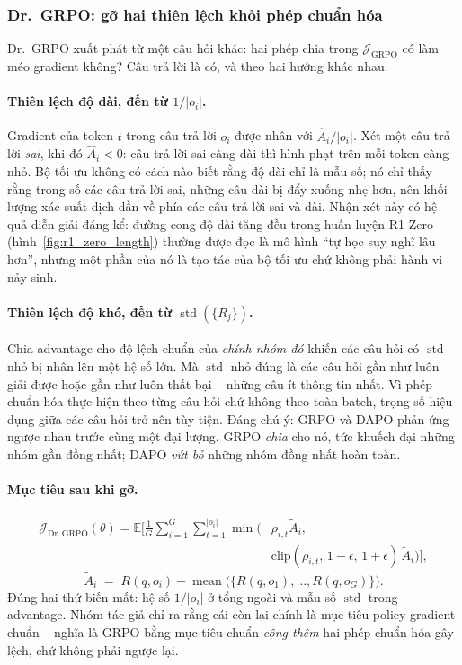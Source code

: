 \subsubsection{Dr.~GRPO: gỡ hai thiên lệch khỏi phép chuẩn hóa}

Dr.~GRPO \cite{liu2025drgrpo} xuất phát từ một câu hỏi khác: hai phép chia trong $\mathcal{J}_{\mathrm{GRPO}}$ có làm méo gradient không? Câu trả lời là có, và theo hai hướng khác nhau.

\paragraph{Thiên lệch độ dài, đến từ $1/|o_i|$.}
Gradient của token $t$ trong câu trả lời $o_i$ được nhân với $\hat{A}_i / |o_i|$. Xét một câu trả lời \emph{sai}, khi đó $\hat{A}_i < 0$: câu trả lời sai càng dài thì hình phạt trên mỗi token càng nhỏ. Bộ tối ưu không có cách nào biết rằng độ dài chỉ là mẫu số; nó chỉ thấy rằng trong số các câu trả lời sai, những câu dài bị đẩy xuống nhẹ hơn, nên khối lượng xác suất dịch dần về phía các câu trả lời sai và dài. Nhận xét này có hệ quả diễn giải đáng kể: đường cong độ dài tăng đều trong huấn luyện R1-Zero (hình~\ref{fig:r1_zero_length}) thường được đọc là mô hình ``tự học suy nghĩ lâu hơn'', nhưng một phần của nó là tạo tác của bộ tối ưu chứ không phải hành vi nảy sinh.

\paragraph{Thiên lệch độ khó, đến từ $\operatorname{std}(\{R_j\})$.}
Chia advantage cho độ lệch chuẩn của \emph{chính nhóm đó} khiến các câu hỏi có $\operatorname{std}$ nhỏ bị nhân lên một hệ số lớn. Mà $\operatorname{std}$ nhỏ đúng là các câu hỏi gần như luôn giải được hoặc gần như luôn thất bại -- những câu ít thông tin nhất. Vì phép chuẩn hóa thực hiện theo từng câu hỏi chứ không theo toàn batch, trọng số hiệu dụng giữa các câu hỏi trở nên tùy tiện. Đáng chú ý: GRPO và DAPO phản ứng ngược nhau trước cùng một đại lượng. GRPO \emph{chia} cho nó, tức khuếch đại những nhóm gần đồng nhất; DAPO \emph{vứt bỏ} những nhóm đồng nhất hoàn toàn.

\paragraph{Mục tiêu sau khi gỡ.}
\[
\begin{aligned}
\mathcal{J}_{\mathrm{Dr.\,GRPO}}(\theta) = \mathbb{E}\Big[\frac{1}{G}\sum_{i=1}^{G}\sum_{t=1}^{|o_i|}
\min\big(&\rho_{i,t}\tilde{A}_i,\\
&\mathrm{clip}(\rho_{i,t},\,1-\epsilon,\,1+\epsilon)\,\tilde{A}_i\big)\Big],
\end{aligned}
\]
\[
\tilde{A}_i \;=\; R(q, o_i) - \operatorname{mean}\big(\{R(q,o_1),\dots,R(q,o_G)\}\big).
\]
Đúng hai thứ biến mất: hệ số $1/|o_i|$ ở tổng ngoài và mẫu số $\operatorname{std}$ trong advantage. Nhóm tác giả chỉ ra rằng cái còn lại chính là mục tiêu policy gradient chuẩn -- nghĩa là GRPO bằng mục tiêu chuẩn \emph{cộng thêm} hai phép chuẩn hóa gây lệch, chứ không phải ngược lại.

